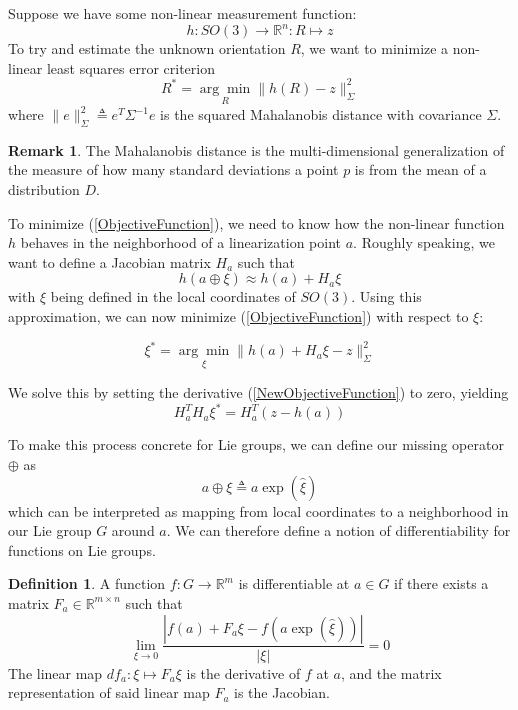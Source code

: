 \documentclass[reqno]{amsart}
\theoremstyle{definition}
\newtheorem{defn}{Definition}[section]
\newtheorem{rem}{Remark}[section]
\numberwithin{equation}{section}
\begin{document}
Suppose we have some non-linear measurement function:
\[h: SO(3) \to \mathbb{R}^n : R \mapsto z\]
To try and estimate the unknown orientation $R$, we want to minimize a non-linear least squares error criterion
\begin{equation}\label{ObjectiveFunction}
R^* = \underset{R}{\arg\min}\|h(R) - z\|_\Sigma^2
\end{equation}
where $\|e\|_\Sigma^2 \triangleq e^T\Sigma^{-1}e$ is the squared Mahalanobis distance with covariance $\Sigma$. 

\begin{rem}
    The Mahalanobis distance is the multi-dimensional generalization of the measure of how many standard deviations a point $p$ is from the mean of a distribution $D$.
\end{rem}

To minimize (\ref{ObjectiveFunction}), we need to know how the non-linear function $h$ behaves in the neighborhood of a linearization point $a$. Roughly speaking, we want to define a Jacobian matrix $H_a$ such that
\begin{equation}
    h(a \oplus \xi) \approx h(a) + H_a\xi
\end{equation}
with $\xi$ being defined in the local coordinates of $SO(3)$. Using this approximation, we can now minimize (\ref{ObjectiveFunction}) with respect to $\xi$:

\begin{equation}\label{NewObjectiveFunction}
    \xi^* = \underset{\xi}{\arg\min}\|h(a) + H_a\xi - z\|_\Sigma^2
\end{equation}

We solve this by setting the derivative (\ref{NewObjectiveFunction}) to zero, yielding
\begin{equation*}
    H_a^TH_a\xi^* = H_a^T(z - h(a))
\end{equation*}

To make this process concrete for Lie groups, we can define our missing operator $\oplus$ as
\begin{equation}
    a \oplus \xi \triangleq a\exp(\hat\xi)
\end{equation}
which can be interpreted as mapping from local coordinates to a neighborhood in our Lie group $G$ around $a$. We can therefore define a notion of differentiability for functions on Lie groups.

\begin{defn}
    A function $f : G \to \mathbb{R}^m$ is differentiable at $a \in G$ if there exists a matrix $F_a \in \mathbb{R}^{m \times n}$ such that
    \begin{equation*}
        \lim_{\xi \to 0} \frac{|f(a) + F_a\xi - f(a\exp(\hat\xi))|}{|\xi|} = 0
    \end{equation*}
    The linear map $df_a : \xi \mapsto F_a\xi$ is the derivative of $f$ at $a$, and the matrix representation of said linear map $F_a$ is the Jacobian.
\end{defn}
\end{document}
